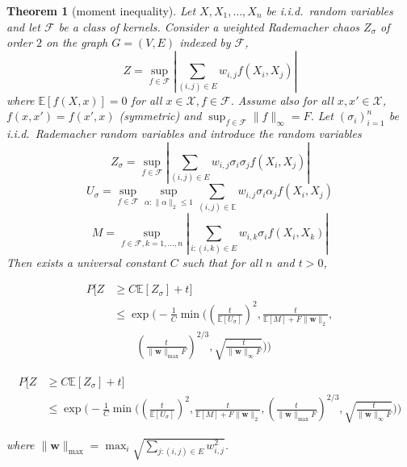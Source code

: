 \documentclass[letterpaper]{article} %
\def\DoubleColumn{}
\def\DoubleColumnEnd{}
\def\SingleColumn{}
\def\SingleColumnEnd{}
\newtheorem{theorem}{Theorem}
\newcommand{\E}{\mathbb{E}}
\newcommand{\Pro}{P}
\newcommand{\weight}{\mathbf{w}}
\newcommand{\xspace}{\mathcal{X}}
\newcommand{\rademacher}{\sigma}
\newcommand{\pair}[1]{(#1)}
\begin{document}
\begin{theorem}[moment inequality]
    \label{th:moment_inequality_of_weighted_u_statistics}
    Let $X, X_1,\dots,X_n$ be i.i.d.\ random variables and let $\mathcal F$ be a class of kernels. Consider a weighted Rademacher chaos $Z_\rademacher{}$ of order $2$ on the graph $G=(V,E)$ indexed by $\mathcal F$,
    \[Z = \sup_{f\in\mathcal F}|\sum_{\pair{i,j}\in E}w_{i,j}f(X_i,X_j)|\]
    where $\E[f(X,x)]=0$ for all $x\in\xspace{},f\in\mathcal{F}$. Assume also for all $x,x'\in\xspace$, $f(x,x')=f(x',x)$ (symmetric) and $\sup_{f\in\mathcal F}\|f\|_\infty=F$. Let $(\rademacher{}_i)_{i=1}^n$ be i.i.d.\ Rademacher random variables and introduce the random variables
    \[Z_\rademacher = \sup_{f\in\mathcal F}|\sum_{\pair{i,j}\in E}w_{i,j}\rademacher_i\rademacher_jf(X_i,X_j)|\]
    \[U_\rademacher = \sup_{f\in\mathcal F}\sup_{\alpha:\|\alpha\|_2\le 1}\sum_{\pair{i,j}\in\E}w_{i,j}\rademacher_i\alpha_jf(X_i,X_j)\]
    \[M=\sup_{f\in\mathcal F,k=1,\dots,n}|\sum_{i:(i,k)\in E}w_{i,k}\rademacher_if(X_i,X_k)|\]
    Then exists a universal constant $C$ such that for all $n$ and $t>0$,
    \DoubleColumn
    \begin{align*}
        \Pro[Z&\ge C\E[Z_\rademacher]+t]\\
        &\le \exp\bigg(-\frac{1}{C}\min\Big((\frac{t}{\E[U_\rademacher]})^2,\frac{t}{\E[M]+F\|\weight{}\|_2},\\
        &\qquad(\frac{t}{\|\weight{}\|_{\max}F})^{2/3},\sqrt{\frac{t}{\|\weight{}\|_\infty F}}\Big)\bigg)
    \end{align*}
    \DoubleColumnEnd
    \SingleColumn
    \begin{align*}
        \Pro[Z&\ge C\E[Z_\rademacher]+t]\\
        &\le \exp\bigg(-\frac{1}{C}\min\Big((\frac{t}{\E[U_\rademacher]})^2,\frac{t}{\E[M]+F\|\weight{}\|_2},(\frac{t}{\|\weight{}\|_{\max}F})^{2/3},\sqrt{\frac{t}{\|\weight{}\|_\infty F}}\Big)\bigg)
    \end{align*}
    \SingleColumnEnd
    where $\|\weight{}\|_{\max}=\max_i \sqrt{\sum_{j:\pair{i,j}\in E} w_{i,j}^2}$.
\end{theorem}
\end{document}
